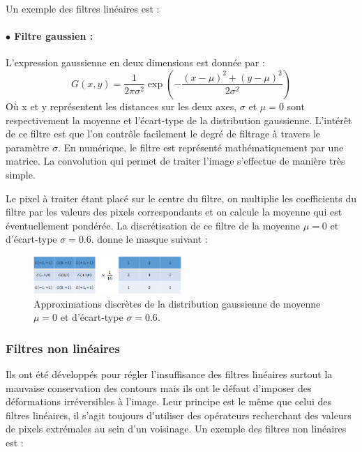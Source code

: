 Un exemple des filtres linéaires est :
\paragraph{ $\bullet$ Filtre gaussien :}
L’expression gaussienne en deux dimensions est donnée par :
\begin{equation}
  G(x, y) = \frac{1}{2\pi \sigma^2} \exp(-\frac{(x-\mu)^2+(y-\mu)^2}{2 \sigma^2})
\end{equation}
Où x et y représentent les distances sur les deux axes, $\sigma$ et $\mu = 0$ sont respectivement la moyenne et l’écart-type de la distribution gaussienne. L’intérêt de ce filtre est que l’on contrôle facilement le degré de filtrage à travers le paramètre $\sigma$. En numérique, le filtre est représenté mathématiquement par une matrice. La convolution qui permet de traiter l'image s'effectue de manière très simple.

Le pixel à traiter étant placé sur le centre du filtre, on multiplie les
coefficients du filtre par les valeurs des pixels correspondants et on calcule la moyenne qui est éventuellement pondérée. La discrétisation de ce filtre de la moyenne $\mu = 0$  et d’écart-type $\sigma = 0.6$. donne le masque suivant :

\begin{figure}[H]
	\centering
	\includegraphics[width=0.5\textwidth]{Figures/gaussien} 
	\caption{Approximations discrètes de la distribution gaussienne de
		moyenne $\mu = 0$  et d’écart-type $\sigma = 0.6$.}
\end{figure}

\subsubsection{Filtres non linéaires}
Ils ont été développés pour régler l’insuffisance des filtres linéaires
surtout la mauvaise conservation des contours mais ils ont le défaut
d’imposer des déformations irréversibles à l’image. Leur principe est le même
que celui des filtres linéaires, il s’agit toujours d’utiliser des opérateurs
recherchant des valeurs de pixels extrémales au sein d’un voisinage.
Un exemple des filtres non linéaires est :

